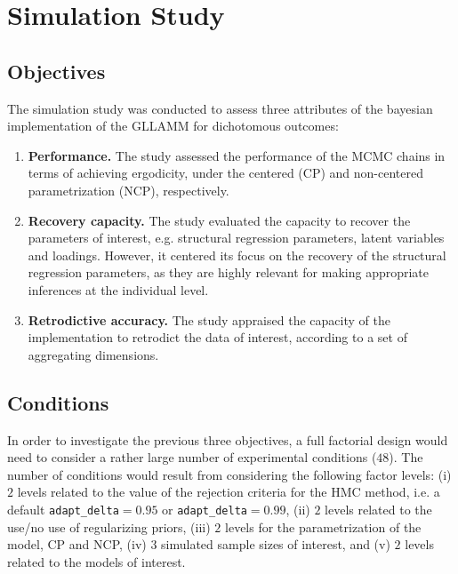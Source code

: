 \chapter{Simulation Study} \label{chap:simulation}

\section{Objectives} \label{sec:objectives}

The simulation study was conducted to assess three attributes of the bayesian implementation of the GLLAMM for dichotomous outcomes:
%
\begin{enumerate}
	\item \textbf{Performance.} The study assessed the performance of the MCMC chains in terms of achieving ergodicity, under the centered (CP) and non-centered parametrization (NCP), respectively.
	\item \textbf{Recovery capacity.} The study evaluated the capacity to recover the parameters of interest, e.g. structural regression parameters, latent variables and loadings. However, it centered its focus on the recovery of the structural regression parameters, as they are highly relevant for making appropriate inferences at the individual level.
	\item \textbf{Retrodictive accuracy.} The study appraised the capacity of the implementation to retrodict the data of interest, according to a set of aggregating dimensions.
\end{enumerate} 


\section{Conditions} \label{sec:conditions}

In order to investigate the previous three objectives, a full factorial design would need to consider a rather large number of experimental conditions ($48$). The number of conditions would result from considering the following factor levels: (i) $2$ levels related to the value of the rejection criteria for the HMC method, i.e. a default \texttt{adapt\_delta}$=0.95$ or \texttt{adapt\_delta}$=0.99$, (ii) $2$ levels related to the use/no use of regularizing priors, (iii) $2$ levels for the parametrization of the model, CP and NCP, (iv) $3$ simulated sample sizes of interest, and (v) $2$ levels related to the models of interest.

